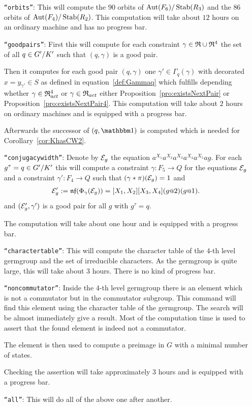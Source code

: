 \documentclass[a4paper,11pt]{amsart}
\begin{document}
\begin{itemize}
    \item [\texttt{``orbits''}:] This will compute the $90$ orbits of ${\operatorname{{Aut}}(F_6)/\operatorname{Stab}(R_3)}$ and the
		       $86$ orbits of ${\operatorname{{Aut}}(F_4)/\operatorname{Stab}(R_2)}$. This computation will take
		       about $12$ hours on an ordinary machine and has no progress bar.
   \item [\texttt{``goodpairs''}:] First this will compute for each constraint $\gamma\in\mathfrak{R}\cup\mathfrak{R}^4$ 
		      the set of all $q\in{G'/K'}$ such that $(q,\gamma)$ is a good pair.
		      
		      Then it computes for each good pair $(q,\gamma)$ one $\gamma'\in\Gamma_q(\gamma)$
		      with decorated $x=y_{\gamma'}\in S$ as defined in equation~\ref{def:Gammaq} which 
		      fulfills depending whether $\gamma\in\mathfrak{R}^4_{act}$ or $\gamma\in\mathfrak{R}_{act}$ 
		      either Proposition~\ref{pro:existsNextPair} or Proposition~\ref{pro:existsNextPair4}.
		      This computation will take about $2$ hours on ordinary machines and is equipped 
		      with a progress bar. 
		      
		      Afterwards the successor of $(q,\id)$ is computed which is needed for 
		      Corollary~\ref{cor:KhasCW2}. 
   \item [\texttt{``conjugacywidth''}:] Denote by $\mathcal{E}_g$ the equation $a^{X_1}a^{X_2}a^{X_3}a^{X_4}a^{X_5}ag$.
		      For each $g^\tau=q\in{G'/K'}$ this will compute a constraint 
		      $\gamma\colon F_5 \to Q$ for the equations $\mathcal{E}_g$
		      and a constraint $\gamma'\colon F_4\to Q$ such that
		      $(\gamma * \pi)(\mathcal{E}_g) = 1$ and 
		      \[\eq{E}'_g := \nf(\Phi_\gamma(\eq{E}_g))=[X_1,X_2][X_3,X_4](g\at{2})(g\at{1}).\] and
		      $(\mathcal{E}'_g,\gamma')$ is a good pair for all $g$ with $g^\tau=q$.
		      
		      The computation will take about one hour and is equipped with a progress bar.
   \item [\texttt{``charactertable''}:] This will compute the character table of the $4$-th level germgroup
		      and the set of irreducible characters. 
		      As the germgroup is quite large, this
		      will take about $3$ hours. There is no kind of progress bar.
   \item [\texttt{``noncommutator''}:] Inside the $4$-th level germgroup there is an element which is not
		      a commutator but in the commutator subgroup. This command will find this 
		      element using the character table of the germgroup. The search will be 
		      almost immediately give a result. Most of the computation time is used
		      to assert that the found element is indeed not a commutator.
		      
		      The element is then used to compute a preimage in $G$ with a minimal 
		      number of states.

		      Checking the assertion will take approximately $3$ hours and is equipped 
		      with a progress bar. 
  \item [\texttt{``all''}:] This will do all of the above one after another.		      
   \end{itemize}
\end{document}
